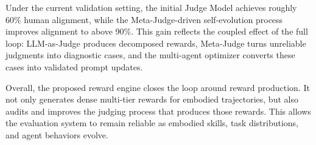 Under the current validation setting, the initial Judge Model achieves roughly 60\% human alignment, while the Meta-Judge-driven self-evolution process improves alignment to above 90\%. This gain reflects the coupled effect of the full loop: LLM-as-Judge produces decomposed rewards, Meta-Judge turns unreliable judgments into diagnostic cases, and the multi-agent optimizer converts these cases into validated prompt updates.

Overall, the proposed reward engine closes the loop around reward production. It not only generates dense multi-tier rewards for embodied trajectories, but also audits and improves the judging process that produces those rewards. This allows the evaluation system to remain reliable as embodied skills, task distributions, and agent behaviors evolve.
